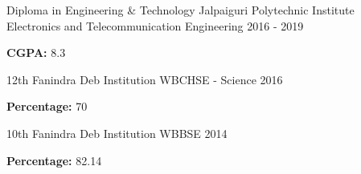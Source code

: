 \begin{cventries}
  \cventry
    {Diploma in Engineering \& Technology} %
    {Jalpaiguri Polytechnic Institute} %
    {Electronics and Telecommunication Engineering} %
    {2016 - 2019} %
    {
      \begin{cvitems} %
        \item {\textbf{CGPA:} 8.3}
      \end{cvitems}
    }

  \cventry
    {12th} %
    {Fanindra Deb Institution} %
    {WBCHSE - Science} %
    {2016} %
    {
      \begin{cvitems} %
        \item {\textbf{Percentage:} 70}
      \end{cvitems}
    }

  \cventry
    {10th} %
    {Fanindra Deb Institution} %
    {WBBSE} %
    {2014} %
    {
      \begin{cvitems} %
        \item {\textbf{Percentage:} 82.14}
      \end{cvitems}
    }
\end{cventries}
